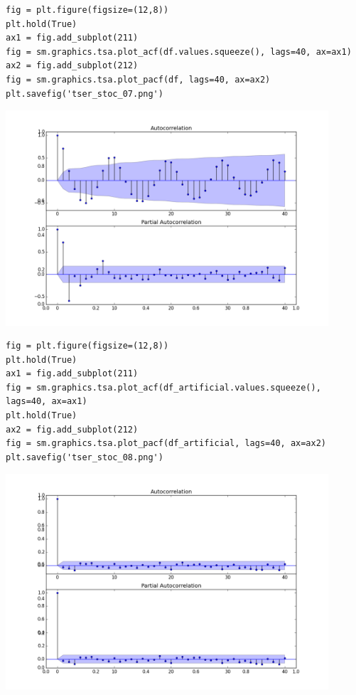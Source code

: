 \documentclass[12pt,fleqn]{article}\usepackage{../../common}
\begin{document}
\begin{verbatim}
fig = plt.figure(figsize=(12,8))
plt.hold(True)
ax1 = fig.add_subplot(211)
fig = sm.graphics.tsa.plot_acf(df.values.squeeze(), lags=40, ax=ax1)
ax2 = fig.add_subplot(212)
fig = sm.graphics.tsa.plot_pacf(df, lags=40, ax=ax2)
plt.savefig('tser_stoc_07.png')
\end{verbatim}

\includegraphics[height=8cm]{tser_stoc_07.png}

\begin{verbatim}
fig = plt.figure(figsize=(12,8))
plt.hold(True)
ax1 = fig.add_subplot(211)
fig = sm.graphics.tsa.plot_acf(df_artificial.values.squeeze(), lags=40, ax=ax1)
plt.hold(True)
ax2 = fig.add_subplot(212)
fig = sm.graphics.tsa.plot_pacf(df_artificial, lags=40, ax=ax2)
plt.savefig('tser_stoc_08.png')
\end{verbatim}

\includegraphics[height=8cm]{tser_stoc_08.png}
\end{document}
